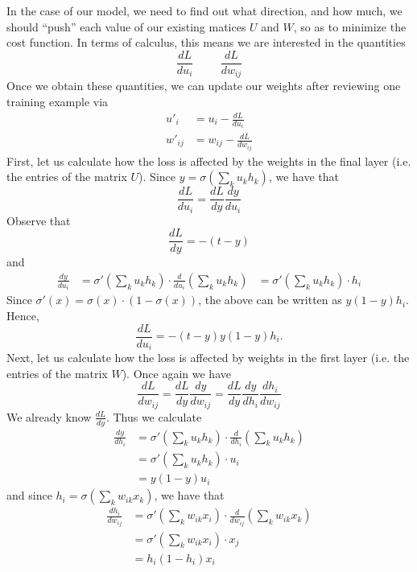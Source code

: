 \documentclass[12pt,letterpaper]{book}
\theoremstyle{definition}
\begin{document}
  In the case of our model, we need to find out what direction, and how much, we should ``push'' each 
  value of our existing matices $U$ and $W$, so as to minimize the cost function. 
  In terms of calculus, this means we are interested in the quantities 
  \[
      \frac{dL}{du_i} \hspace{1cm} \frac{dL}{dw_{ij}}
  \]
  Once we obtain these quantities, we can update our weights after reviewing one training
  example via
  \begin{align}
    u'_i &= u_i - \frac{dL}{du_i} \\
    w'_{ij}  &= w_{ij} - \frac{dL}{dw_{ij}}
  \end{align}
  First, let us calculate how the loss is affected by the weights in the final layer (i.e. the 
  entries of the matrix $U$). Since $y = \sigma(\sum_{k}u_{k}h_k)$, we have that 
  \[
    \frac{dL}{du_i} = \frac{dL}{dy}\frac{dy}{du_i}
  \]
  Observe that 
  \[
    \frac{dL}{dy} = -(t - y)
  \]
  and 
  \begin{align}
    \frac{dy}{du_i} 
    &= \sigma'\left(\sum_{k}u_{k}h_k\right) \cdot \frac{d}{du_i}\left(\sum_{k}u_{k}h_k\right)
    &= \sigma'\left(\sum_{k}u_{k}h_k\right) \cdot h_i
  \end{align}
  Since $\sigma'(x) = \sigma(x)\cdot(1 - \sigma(x))$, the above can be written as 
  $y(1 - y)h_i$. Hence,
  \[
    \frac{dL}{du_i}
    = 
    -(t - y)y(1 - y)h_i.
  \]
  Next, let us calculate how the loss is affected by weights in the first layer (i.e. the entries 
  of the matrix $W$). Once again we have 
  \[
    \frac{dL}{dw_{ij}} = \frac{dL}{dy}\frac{dy}{dw_{ij}} = \frac{dL}{dy}\frac{dy}{dh_{i}}
    \frac{dh_i}{dw_{ij}} 
  \]
  We already know $\frac{dL}{dy}$. Thus we calculate 
  \begin{align}
    \frac{dy}{dh_{i}}
    &= \sigma'\left(\sum_{k}u_{k}h_k\right) \cdot \frac{d}{dh_i}\left(\sum_{k}u_{k}h_k\right)\\
    &= \sigma'\left(\sum_{k}u_{k}h_k\right) \cdot u_i\\
    &= y(1 - y)u_i
  \end{align}
  and since $h_i = \sigma\left( \sum_{k}w_{ik}x_k \right)$, we have that 
  \begin{align}
    \frac{dh_i}{dw_{ij}} 
    &= \sigma'\left(\sum_{k}w_{ik}x_i\right) \cdot \frac{d}{dw_{ij}} \left( \sum_{k}w_{ik}x_k \right) \\
    &= \sigma'\left(\sum_{k}w_{ik}x_i\right) \cdot x_j  \\
    &= h_i(1 - h_i)x_i
  \end{align}
\end{document}
